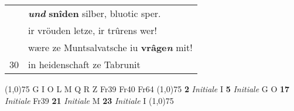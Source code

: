 \documentclass[8pt,a4paper,notitlepage]{article}
\begin{document}
\begin{table}[ht]
\begin{minipage}[t]{0.5\linewidth}
\begin{tabular}{rl}
 & \textit{\textbf{und}} \textbf{snîden} silber, bluotic sper.\\ 
 & ir vröuden letze, ir trûrens wer!\\ 
 & wære ze Muntsalvatsche iu \textbf{vrâge\textit{n}} mit!\\ 
30 & in heidenschaft ze Tabrunit\\ 
\end{tabular}
\scriptsize
\line(1,0){75} \newline
G I O L M Q R Z Fr39 Fr40 Fr64 \newline
\line(1,0){75} \newline
\textbf{2} \textit{Initiale} I  \textbf{5} \textit{Initiale} G O  \textbf{17} \textit{Initiale} Fr39  \textbf{21} \textit{Initiale} M  \textbf{23} \textit{Initiale} I  \newline
\line(1,0){75} \newline

\end{minipage}
\end{table}
\end{document}
